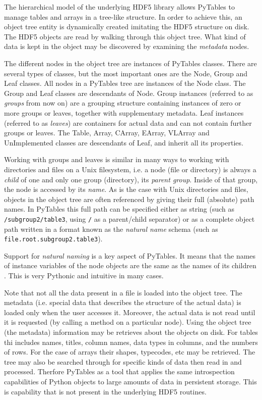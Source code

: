 The hierarchical model of the underlying HDF5 library allows
PyTables to manage tables and arrays in a tree-like structure. In
order to achieve this, an object tree entity is
dynamically created imitating the HDF5 structure
on disk. The HDF5 objects are read by walking through this object
tree. What kind of data is kept in the object may be discovered 
by examining the \emph{metadata} nodes.

The different nodes in the object tree are instances of PyTables
classes. There are several types of classes, but the most important
ones are the Node, Group and
Leaf classes. All nodes in a PyTables tree are
instances of the Node class. The
Group and Leaf classes are
descendants of Node. Group
instances (referred to as \emph{groups} from now on) are
a grouping structure containing instances of zero or more groups or
leaves, together with supplementary metadata. Leaf
instances (referred to as \emph{leaves}) are containers
for actual data and can not contain further groups or leaves. The
Table, Array,
CArray, EArray,
VLArray and UnImplemented
classes are descendants of Leaf, and inherit all
its properties.

Working with groups and leaves is similar in many ways to
working with directories and files on a Unix filesystem, i.e. a node
(file or directory) is always a \emph{child} of one and
only one group (directory), its \emph{parent group}.
Inside of that group, the node is accessed by its
\emph{name}. As is the case with Unix directories and
files, objects in the object tree are often referenced by giving their
full (absolute) path names. In PyTables this full path can be
specified either as string (such as
\texttt{/subgroup2/table3}, using \texttt{/} as
a parent/child separator) or as a complete object path written in a
format known as the \emph{natural name} schema (such as
\texttt{file.root.subgroup2.table3}).

Support for \emph{natural naming} is a key aspect
of PyTables. It means that the names of instance variables of the node
objects are the same as the names of its children \cite{Mertz2000}. 
This is very Pythonic and intuitive in many cases. 

Note that not all the data present in a file
is loaded into the object tree. The metadata
(i.e. special data that describes the structure of the actual data) is
loaded only when the user accesses it. Moreover,
the actual data is not read until it is requested (by calling a method
on a particular node). Using the object tree (the metadata)
information may be retrieves about the objects on disk.  For tables 
thi includes names, titles, column names, data types in columns, and the numbers of rows.
For the case of arrays their shapes, typecodes, etc may be retrieved. 
The tree may also be searched through for specific kinds of data then read in and processed.
Therfore PyTables as a tool that
applies the same introspection capabilities of Python objects to large
amounts of data in persistent storage.  This is capability that is not
present in the underlying HDF5 routines.


